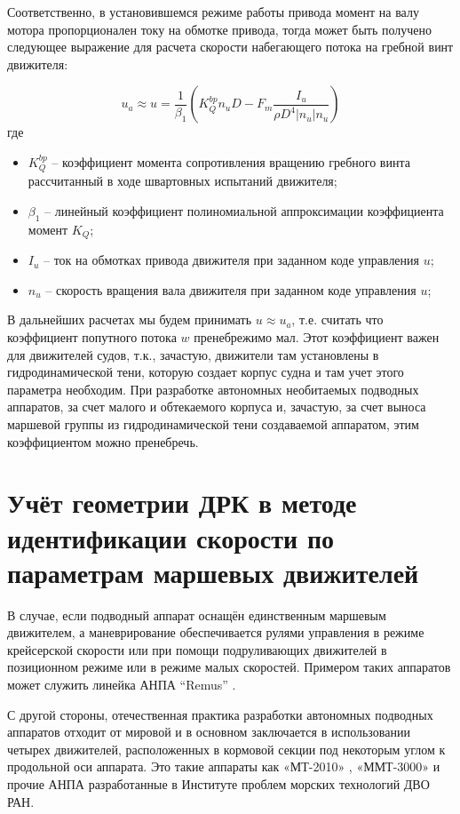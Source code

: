 Соответственно, в установившемся режиме работы привода момент на валу мотора пропорционален току на обмотке привода, тогда может быть получено следующее выражение для расчета скорости набегающего потока на гребной винт движителя:

\begin{equation}
    \label{eq:velocity_final}
    u_a \approx u = \frac{1}{\beta_1} \left( K_Q^{bp} n_u D - F_m\frac{I_u}{\rho D^4|n_u|n_u} \right)
\end{equation}
\noindent где 
\begin{itemize}
    \item $K_Q^{bp}$ -- коэффициент момента сопротивления вращению гребного винта рассчитанный в ходе швартовных испытаний движителя; \item $\beta_1$ -- линейный коэффициент полиномиальной аппроксимации коэффициента момент $K_Q$;
    \item $I_u$ -- ток на обмотках привода движителя при заданном коде управления $u$;
    \item $n_u$ -- скорость вращения вала движителя при заданном коде управления $u$;
\end{itemize}

В дальнейших расчетах мы будем принимать $u \approx u_a$, т.е. считать что коэффициент попутного потока $w$ пренебрежимо мал.
Этот коэффициент важен для движителей судов, т.к., зачастую, движители там установлены в гидродинамической тени, которую создает корпус судна и там учет этого параметра необходим.
При разработке автономных необитаемых подводных аппаратов, за счет малого и обтекаемого корпуса и, зачастую, за счет выноса маршевой группы из гидродинамической тени создаваемой аппаратом, этим коэффициентом можно пренебречь.

\section{Учёт геометрии ДРК в методе идентификации скорости по параметрам маршевых движителей}
В случае, если подводный аппарат оснащён единственным маршевым движителем, а маневрирование обеспечивается рулями управления в режиме крейсерской скорости или при помощи подруливающих движителей в позиционном режиме или в режиме малых скоростей. Примером таких аппаратов может служить линейка АНПА ``Remus'' \cite{allen1997remus, kukulya2010under}.

С другой стороны, отечественная практика разработки автономных подводных аппаратов отходит от мировой и в основном заключается в использовании четырех движителей, расположенных в кормовой секции под некоторым углом к продольной оси аппарата.
Это такие аппараты как «МТ-2010» \cite{борейко2011малогабаритный}, «ММТ-3000» \cite{горнак2007ммт} и прочие АНПА разработанные в Институте проблем морских технологий ДВО РАН. 

